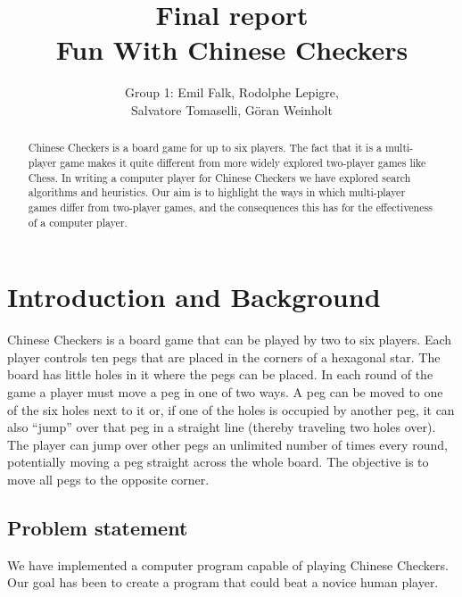 \documentclass[a4paper,11pt]{article}
\begin{document}
\title{Final report\\Fun With Chinese Checkers}
\author{Group 1: Emil Falk, Rodolphe Lepigre,\\
        Salvatore Tomaselli, G\"oran Weinholt}
\maketitle
\begin{abstract}\centering
Chinese Checkers is a board game for up to six players. The fact that
it is a multi-player game makes it quite different from more widely
explored two-player games like Chess. In writing a computer player for
Chinese Checkers we have explored search algorithms and heuristics.
Our aim is to highlight the ways in which multi-player games differ
from two-player games, and the consequences this has for the
effectiveness of a computer player.
\end{abstract}

\section{Introduction and Background}
Chinese Checkers is a board game that can be played by two to six players.
Each player controls ten pegs that are placed in the corners of a
hexagonal star. The board has little holes in it where the pegs can be
placed. In each round of the game a player must move a peg in one of
two ways. A peg can be moved to one of the six holes next to it or, if
one of the holes is occupied by another peg, it can also ``jump'' over
that peg in a straight line (thereby traveling two holes over). The
player can jump over other pegs an unlimited number of times every
round, potentially moving a peg straight across the whole board. The
objective is to move all pegs to the opposite corner.

\subsection{Problem statement}
We have implemented a computer program capable of playing Chinese
Checkers. Our goal has been to create a program that could beat a
novice human player.
\end{document}

